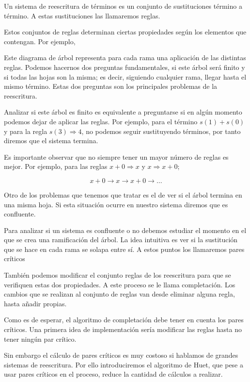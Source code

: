 Un sistema de reescritura de términos es un conjunto de sustituciones
término a término. A estas sustituciones las llamaremos reglas.

Estos conjuntos de reglas determinan ciertas propiedades según los
elementos que contengan. Por ejemplo,

\begin{figure}[h]
  \centering
\end{figure}

Este diagrama de árbol representa para cada rama una aplicación de las
distintas reglas. Podemos hacernos dos preguntas fundamentales, si
este árbol será finito y si todas las hojas son la misma; es decir,
siguiendo cualquier rama, llegar hasta el mismo término. Estas dos
preguntas son los principales problemas de la reescritura.

Analizar si este árbol es finito es equivalente a preguntarse si en
algún momento podemos dejar de aplicar las reglas. Por ejemplo, para
el término $s(1) + s(0)$ y para la regla $s(3) \Rightarrow 4$, no
podemos seguir sustituyendo términos, por tanto diremos que el sistema
termina.

Es importante observar que no siempre tener un mayor número de reglas
es mejor. Por ejemplo, para las reglas $ x + 0 \Rightarrow x$ y
$x \Rightarrow x + 0$;

\[
  x + 0 \longrightarrow x \longrightarrow x+0 \longrightarrow \dots
\]

Otro de los problemas que tenemos que tratar es el de ver si el árbol
termina en una misma hoja. Si esta situación ocurre en nuestro sistema
diremos que es confluente.

Para analizar si un sistema es confluente o no debemos estudiar el
momento en el que se crea una ramificación del árbol. La idea
intuitiva es ver si la sustitución que se hace en cada rama se solapa
entre sí. A estos puntos los llamaremos pares críticos

También podemos modificar el conjunto reglas de los reescritura para
que se verifiquen estas dos propiedades. A este proceso se le llama
completación. Los cambios que se realizan al conjunto de reglas van
desde eliminar alguna regla, hasta añadir propias.

Como es de esperar, el algoritmo de completación debe tener en cuenta
los pares críticos. Una primera idea de implementación sería modificar
las reglas hasta no tener ningún par crítico.

Sin embargo el cálculo de pares críticos es muy costoso si hablamos de
grandes sistemas de reescritura. Por ello introduciremos el algoritmo
de Huet, que pese a usar pares críticos en el proceso, reduce la
cantidad de cálculos a realizar.


